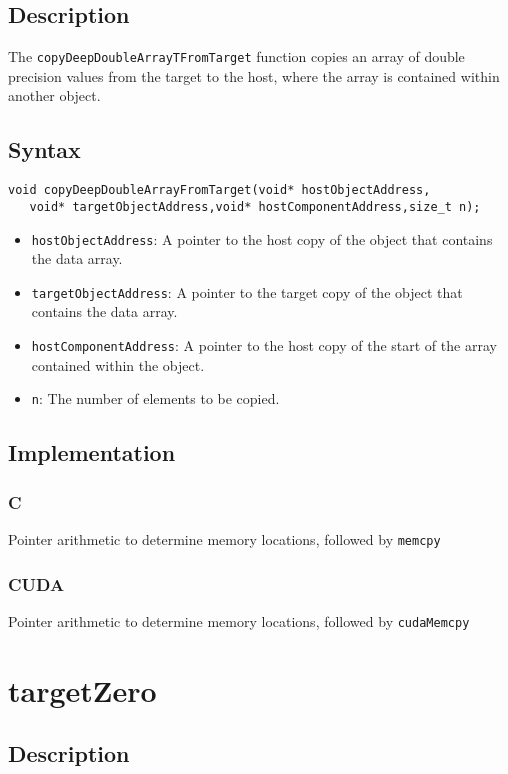 \subsection{Description}

The \verb+copyDeepDoubleArrayTFromTarget+ function copies an array of double precision values from the target to the host, where the array is contained within another object.

\subsection{Syntax}
\begin{verbatim}
void copyDeepDoubleArrayFromTarget(void* hostObjectAddress,
   void* targetObjectAddress,void* hostComponentAddress,size_t n);
\end{verbatim}

\begin{itemize}
\item \verb+hostObjectAddress+: A pointer to the host copy of the object that contains the data array.
\item \verb+targetObjectAddress+: A pointer to the target copy of the object that contains the data array.
\item \verb+hostComponentAddress+: A pointer to the host copy of the start of the array contained within the object.
\item \verb+n+: The number of elements to be copied.
\end{itemize}

\subsection{Implementation}
\subsubsection{C}
Pointer arithmetic to determine memory locations, followed by \verb+memcpy+
\subsubsection{CUDA}
Pointer arithmetic to determine memory locations, followed by \verb+cudaMemcpy+


\newpage
\section{targetZero}

\subsection{Description}

